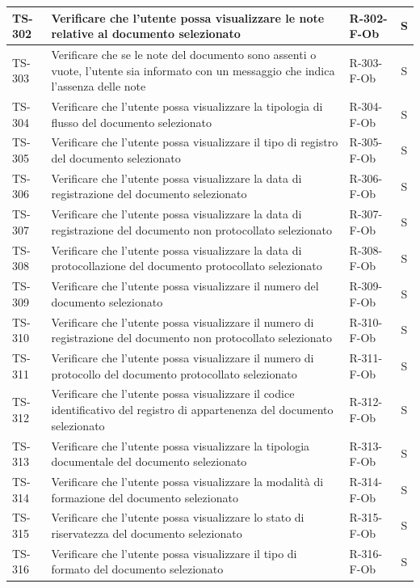 \documentclass[a4paper,12pt]{article}
\begin{document}
\begin{longtable}{|p{1.5cm}|p{8.3cm}|p{2.4cm}|c|}
\hline
TS-302 & Verificare che l'utente possa visualizzare le note relative al documento selezionato & R-302-F-Ob & S \\
\hline
TS-303 & Verificare che se le note del documento sono assenti o vuote, l'utente sia informato con un messaggio che indica l'assenza delle note & R-303-F-Ob & S \\
\hline
TS-304 & Verificare che l'utente possa visualizzare la tipologia di flusso del documento selezionato & R-304-F-Ob & S \\
\hline
TS-305 & Verificare che l'utente possa visualizzare il tipo di registro del documento selezionato & R-305-F-Ob & S \\
\hline
TS-306 & Verificare che l'utente possa visualizzare la data di registrazione del documento selezionato & R-306-F-Ob & S \\
\hline
TS-307 & Verificare che l'utente possa visualizzare la data di registrazione del documento non protocollato selezionato & R-307-F-Ob & S \\
\hline
TS-308 & Verificare che l'utente possa visualizzare la data di protocollazione del documento protocollato selezionato & R-308-F-Ob & S \\
\hline
TS-309 & Verificare che l'utente possa visualizzare il numero del documento selezionato & R-309-F-Ob & S \\
\hline
TS-310 & Verificare che l'utente possa visualizzare il numero di registrazione del documento non protocollato selezionato & R-310-F-Ob & S \\
\hline
TS-311 & Verificare che l'utente possa visualizzare il numero di protocollo del documento protocollato selezionato & R-311-F-Ob & S \\
\hline
TS-312 & Verificare che l'utente possa visualizzare il codice identificativo del registro di appartenenza del documento selezionato & R-312-F-Ob & S \\
\hline
TS-313 & Verificare che l'utente possa visualizzare la tipologia documentale del documento selezionato & R-313-F-Ob & S \\
\hline
TS-314 & Verificare che l'utente possa visualizzare la modalità di formazione del documento selezionato & R-314-F-Ob & S \\
\hline
TS-315 & Verificare che l'utente possa visualizzare lo stato di riservatezza del documento selezionato & R-315-F-Ob & S \\
\hline
TS-316 & Verificare che l'utente possa visualizzare il tipo di formato del documento selezionato & R-316-F-Ob & S \\

\end{longtable}
\end{document}
